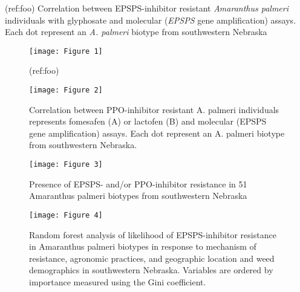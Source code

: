 \documentclass[]{article}
\title{}
\author{}
\date{}
\newcommand{\blandscape}{\begin{landscape}}
\newcommand{\elandscape}{\end{landscape}}
\begin{document}
\listoffigures

\newpage

(ref:foo) Correlation between EPSPS-inhibitor resistant \emph{Amaranthus
palmeri} individuals with glyphosate and molecular (\emph{EPSPS} gene
amplification) assays. Each dot represent an \emph{A. palmeri} biotype
from southwestern Nebraska

\begin{figure}[h]

{\centering \texttt{[image: Figure 1]} 

}

\caption{(ref:foo)}\label{fig:unnamed-chunk-1}
\end{figure}

\newpage

\blandscape

\begin{figure}[h]

{\centering \texttt{[image: Figure 2]} 

}

\caption{Correlation between PPO-inhibitor resistant A. palmeri individuals represents fomesafen (A) or lactofen (B) and molecular (EPSPS gene amplification) assays. Each dot represent an A. palmeri biotype from southwestern Nebraska.}\label{fig:unnamed-chunk-2}
\end{figure}

\newpage

\begin{figure}[h]

{\centering \texttt{[image: Figure 3]} 

}

\caption{Presence of EPSPS- and/or PPO-inhibitor resistance in 51 Amaranthus palmeri biotypes from southwestern Nebraska}\label{fig:unnamed-chunk-3}
\end{figure}
\elandscape

\begin{figure}[h]

{\centering \texttt{[image: Figure 4]} 

}

\caption{Random forest analysis of likelihood of EPSPS-inhibitor resistance in Amaranthus palmeri biotypes in response to mechanism of resistance, agronomic practices, and geographic location and weed demographics in southwestern Nebraska. Variables are ordered by importance measured using the Gini coefficient.}\label{fig:unnamed-chunk-4}
\end{figure}
\end{document}
